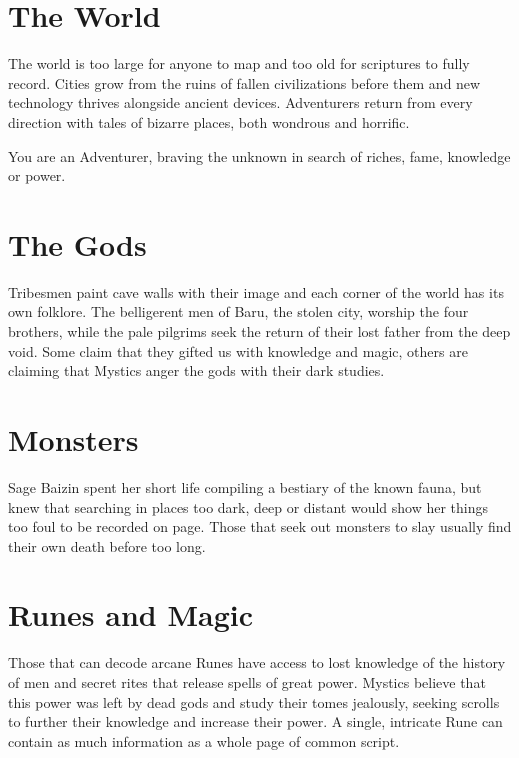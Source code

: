 \documentclass[itdr]{subfiles}
\begin{document}
\toc[2] %

\clearpage


\section*{The World}

The world is too large for anyone to map and too old for scriptures to fully record. Cities grow from the ruins of fallen civilizations before them and new technology thrives alongside ancient devices. Adventurers return from every direction with tales of bizarre places, both wondrous and horrific.

You are an Adventurer, braving the unknown in search of riches, fame, knowledge or power.

\section*{The Gods}

Tribesmen paint cave walls with their image and each corner of the world has its own folklore. The belligerent men of Baru, the stolen city, worship the four brothers, while the pale pilgrims seek the return of their lost father from the deep void. Some claim that they gifted us with knowledge and magic, others are claiming that Mystics anger the gods with their dark studies.

\section*{Monsters}

Sage Baizin spent her short life compiling a bestiary of the known fauna, but knew that searching in places too dark, deep or distant would show her things too foul to be recorded on page. Those that seek out monsters to slay usually find their own death before too long.

\section*{Runes and Magic}
Those that can decode arcane Runes have access to lost knowledge of the history of men and secret rites that release spells of great power. Mystics believe that this power was left by dead gods and study their tomes jealously, seeking scrolls to further their knowledge and increase their power. A single, intricate Rune can contain as much information as a whole page of common script.
\end{document}
